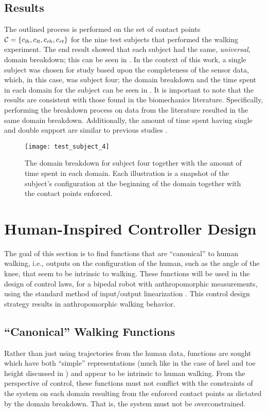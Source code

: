 \subsection{Results} The outlined process is performed on the set of contact
points $\mathcal{C} =  \{c_{\mathit{lh}}, c_{\mathit{lt}}, c_{\mathit{rh}} , c_{\mathit{rt}}\}$ for the nine test subjects that
performed the walking experiment. The end result showed that each subject had
the same, {\em universal}, domain breakdown; this can be seen in
. In the context of this work, a single subject was
chosen for study based upon the completeness of the sensor data, which, in this
case, was subject four; the domain breakdown and the time spent in each domain
for the subject can be seen in . It is important to note that the
results are consistent with those found in the biomechanics
literature. Specifically, performing the breakdown process on data from the
literature \cite{Winter2009} resulted in the same domain breakdown. Additionally,
the amount of time spent having single and double support are similar to
previous studies \cite{Ackermann2007}.

\begin{figure}[t]
  \centering
  \texttt{[image: test\_subject\_4]}
  \caption[The domain breakdown for subject four]{The domain breakdown for subject four together with the amount of time spent in each domain. Each illustration is a snapshot of the subject's configuration at the beginning of the domain together with the contact points enforced.}
  \label{fred}
\end{figure}

\section{Human-Inspired Controller Design} \noindent
The goal of this section is to find functions that are ``canonical'' to human
walking, i.e., outputs on the configuration of the human, such as the angle of
the knee, that seem to be intrinsic to walking. These functions will be used in
the design of control laws, for a bipedal robot with anthropomorphic
measurements, using the standard method of input/output linearization
\cite{Sastry1999}. This control design strategy results in anthropomorphic
walking behavior.

\subsection{``Canonical'' Walking Functions} \label{sec:functions} \noindent
Rather than just using trajectories from the human data, functions are sought which have both ``simple'' representations (much like in the case of heel and toe height discussed in ) and appear to be intrinsic to human walking. From the perspective of control, these functions must not conflict with the constraints of the system on each domain resulting from the enforced contact points as dictated by the domain breakdown. That is, the system must not be overconstrained.

